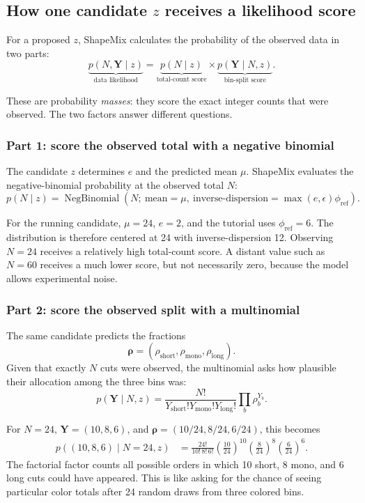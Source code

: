 \documentclass[11pt]{article}
\newcommand{\NB}{\operatorname{NegBinomial}}
\begin{document}
\subsection{How one candidate \(z\) receives a likelihood score}

For a proposed \(z\), ShapeMix calculates the probability of the observed data
in two parts:
\[
\boxed{
\underbrace{p(N,\boldsymbol Y\mid z)}_{\text{data likelihood}}
=
\underbrace{p(N\mid z)}_{\text{total-count score}}
\times
\underbrace{p(\boldsymbol Y\mid N,z)}_{\text{bin-split score}}.
}
\]

These are probability \emph{masses}: they score the exact integer counts that
were observed.  The two factors answer different questions.

\subsubsection*{Part 1: score the observed total with a negative binomial}

The candidate \(z\) determines \(e\) and the predicted mean \(\mu\). ShapeMix
evaluates the negative-binomial probability at the observed total \(N\):
\[
p(N\mid z)
=
\NB\!\left(
N;\ \text{mean}=\mu,\
\text{inverse-dispersion}=\max(e,\epsilon)\phi_{\mathrm{ref}}
\right).
\]

For the running candidate, \(\mu=24\), \(e=2\), and the tutorial uses
\(\phi_{\mathrm{ref}}=6\).  The distribution is therefore centered at 24 with
inverse-dispersion 12.  Observing \(N=24\) receives a relatively high total-count
score.  A distant value such as \(N=60\) receives a much lower score, but not
necessarily zero, because the model allows experimental noise.

\subsubsection*{Part 2: score the observed split with a multinomial}

The same candidate predicts the fractions
\[
\boldsymbol\rho
=
(\rho_{\mathrm{short}},\rho_{\mathrm{mono}},\rho_{\mathrm{long}}).
\]
Given that exactly \(N\) cuts were observed, the multinomial asks how plausible
their allocation among the three bins was:
\[
p(\boldsymbol Y\mid N,z)
=
\frac{N!}{Y_{\mathrm{short}}!Y_{\mathrm{mono}}!Y_{\mathrm{long}}!}
\prod_b\rho_b^{Y_b}.
\]

For \(N=24\), \(\boldsymbol Y=(10,8,6)\), and
\(\boldsymbol\rho=(10/24,8/24,6/24)\), this becomes
\[
\begin{aligned}
p((10,8,6)\mid N=24,z)
&=\frac{24!}{10!\,8!\,6!}
\left(\frac{10}{24}\right)^{10}
\left(\frac{8}{24}\right)^8
\left(\frac{6}{24}\right)^6.
\end{aligned}
\]
The factorial factor counts all possible orders in which 10 short, 8 mono, and
6 long cuts could have appeared.  This is like asking for the chance of seeing
particular color totals after 24 random draws from three colored bins.
\end{document}
